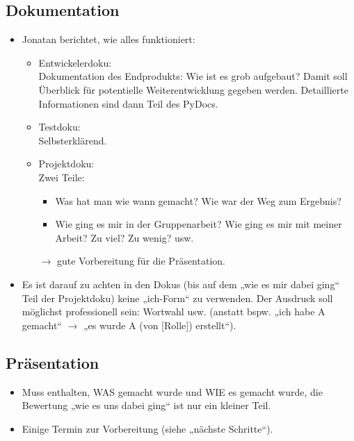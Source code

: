 \documentclass{scrartcl}
\begin{document}
\subsection{Dokumentation}
\begin{itemize}
\item Jonatan berichtet, wie alles funktioniert:
\begin{itemize}
\item Entwickelerdoku:\\
Dokumentation des Endprodukts: Wie ist es grob aufgebaut? Damit soll Überblick für potentielle Weiterentwicklung gegeben werden. Detaillierte Informationen sind dann Teil des PyDocs.
\item Testdoku:\\
Selbsterklärend.
\item Projektdoku:\\
Zwei Teile:
\begin{itemize}
\item Was hat man wie wann gemacht? Wie war der Weg zum Ergebnis? 
\item Wie ging es mir in der Gruppenarbeit? Wie ging es mir mit meiner Arbeit? Zu viel? Zu wenig? usw.
\end{itemize}
$\to$ gute Vorbereitung für die Präsentation.
\end{itemize}
\item Es ist darauf zu achten in den Dokus (bis auf dem „wie es mir dabei ging“ Teil der Projektdoku) keine „ich-Form“ zu verwenden. Der Ausdruck soll möglichst professionell sein: Wortwahl usw. (anstatt bspw. „ich habe A gemacht“ $\to$ „es wurde A (von [Rolle]) erstellt“).
\end{itemize}

\subsection{Präsentation}
\begin{itemize}
\item Muss enthalten, WAS gemacht wurde und WIE es gemacht wurde, die Bewertung „wie es uns dabei ging“ ist nur ein kleiner Teil.
\item Einige Termin zur Vorbereitung (siehe „nächste Schritte“).
\end{itemize}
\end{document}
